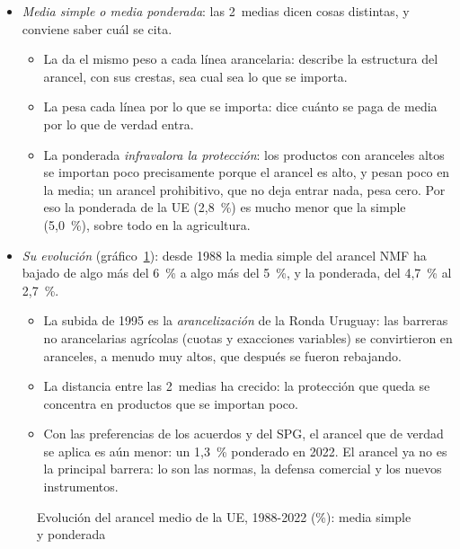 \documentclass[11pt]{article}
\begin{document}
\begin{itemize}
\item \emph{Media simple o media ponderada}: las 2~medias dicen cosas distintas, y conviene saber cuál se cita.
  \begin{itemize}
  \item La  da el mismo peso a cada línea arancelaria: describe la estructura del arancel, con sus crestas, sea cual sea lo que se importa.
  \item La  pesa cada línea por lo que se importa: dice cuánto se paga de media por lo que de verdad entra.
  \item La ponderada \emph{infravalora la protección}: los productos con aranceles altos se importan poco precisamente porque el arancel es alto, y pesan poco en la media; un arancel prohibitivo, que no deja entrar nada, pesa cero. Por eso la ponderada de la UE (2,8~\%) es mucho menor que la simple (5,0~\%), sobre todo en la agricultura.
  \end{itemize}
\item \emph{Su evolución} (gráfico~\ref{fig:aranceles-evolucion}): desde 1988 la media simple del arancel NMF ha bajado de algo más del 6~\% a algo más del 5~\%, y la ponderada, del 4,7~\% al 2,7~\%\nocite{BM2026Aranceles}.
  \begin{itemize}
  \item La subida de 1995 es la \emph{arancelización} de la Ronda Uruguay: las barreras no arancelarias agrícolas (cuotas y exacciones variables) se convirtieron en aranceles, a menudo muy altos, que después se fueron rebajando.
  \item La distancia entre las 2~medias ha crecido: la protección que queda se concentra en productos que se importan poco.
  \item Con las preferencias de los acuerdos y del SPG, el arancel que de verdad se aplica es aún menor: un 1,3~\% ponderado en 2022\nocite{BM2026Aranceles}. El arancel ya no es la principal barrera: lo son las normas, la defensa comercial y los nuevos instrumentos.
  \end{itemize}
\end{itemize}

\begin{figure}[H]
\centering
\caption{Evolución del arancel medio de la UE, 1988-2022 (\%): media simple y ponderada}\label{fig:aranceles-evolucion}
\end{figure}
\end{document}
